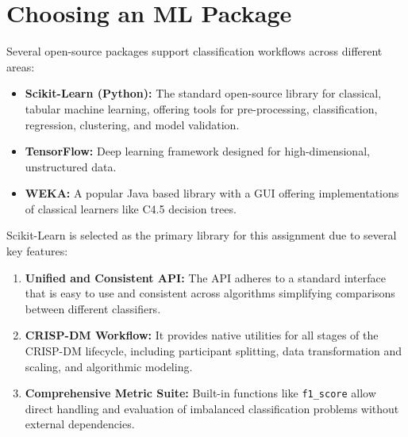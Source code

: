 \documentclass[10pt, a4paper]{article}
\begin{document}

\section{Choosing an ML Package}
Several open-source packages support classification workflows across different areas:
\begin{itemize}
    \item \textbf{Scikit-Learn (Python):} The standard open-source library for classical, tabular machine learning, offering tools for pre-processing, classification, regression, clustering, and model validation.
    \item \textbf{TensorFlow:} Deep learning framework designed for high-dimensional, unstructured data.
    \item \textbf{WEKA:} A popular Java based library with a GUI offering implementations of classical learners like C4.5 decision trees.
\end{itemize}

Scikit-Learn is selected as the primary library for this assignment due to several key features:
\begin{enumerate}
    \item \textbf{Unified and Consistent API:} The API adheres to a standard interface that is easy to use and consistent across algorithms simplifying comparisons between different classifiers.
    \item \textbf{CRISP-DM Workflow:} It provides native utilities for all stages of the CRISP-DM lifecycle, including participant splitting, data transformation and scaling, and algorithmic modeling.
    \item \textbf{Comprehensive Metric Suite:} Built-in functions like \texttt{f1\_score} allow direct handling and evaluation of imbalanced classification problems without external dependencies.
\end{enumerate}
\end{document}
